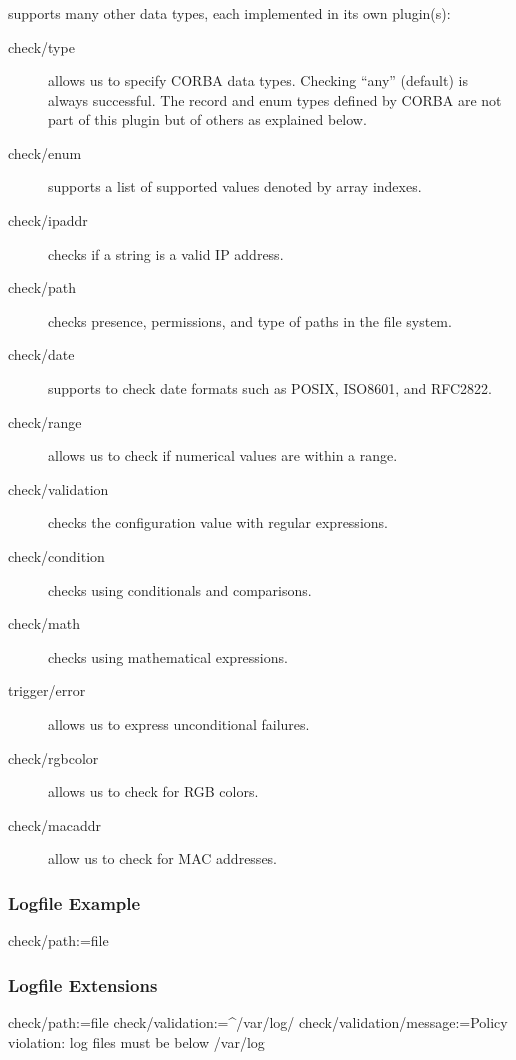\begin{frame}[allowframebreaks]
	\frametitle{}
	\elektra{} supports many other data types, each implemented in its own plugin(s):
	\begin{description}
	\item [check/type] allows us to specify CORBA data types.
	Checking ``any'' (default) is always successful.
	The record and enum types defined by CORBA are not part of this plugin but of others as explained below.

	\item [check/enum] supports a list of supported values denoted by array indexes.
	\item [check/ipaddr] checks if a string is a valid IP address.
	\item [check/path] checks presence, permissions, and type of paths in the file system.
	\item [check/date] supports to check date formats such as POSIX, ISO8601, and RFC2822.
	\item [check/range] allows us to check if numerical values are within a range.
	\item [check/validation] checks the configuration value with regular expressions.
	\item [check/condition] checks using conditionals and comparisons.
	\item [check/math] checks using mathematical expressions.
	\item [trigger/error] allows us to express unconditional failures.
	\item [check/rgbcolor] allows us to check for RGB colors.
	\item [check/macaddr] allow us to check for MAC addresses.
	\end{description}
\end{frame}

\begin{frame}[fragile]
	\frametitle{Logfile Example}

	\begin{code}
	  check/path:=file
	\end{code}
\end{frame}

\begin{frame}[fragile]
	\frametitle{Logfile Extensions}

	\begin{code}
	  check/path:=file
	  check/validation:=^/var/log/
	  check/validation/message:=Policy violation:
	    log files must be below /var/log
	\end{code}
\end{frame}

